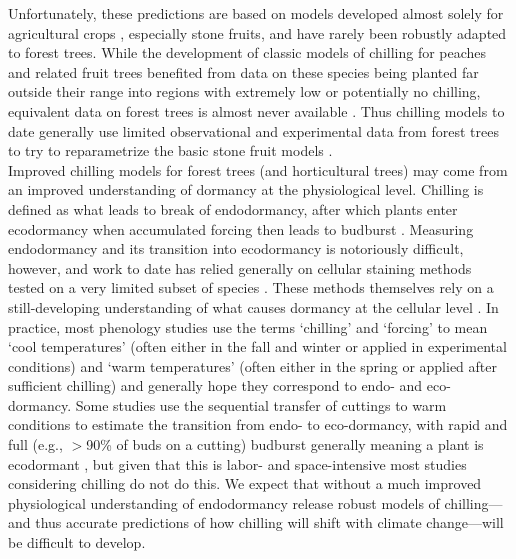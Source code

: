 \documentclass[11pt,letter]{article}
\begin{document}
Unfortunately, these predictions are based on models developed almost solely for agricultural crops \citep[but see][]{harrington2015}, especially stone fruits, and have rarely been robustly adapted to forest trees. While the development of classic models of chilling for peaches and related fruit trees benefited from data on these species being planted far outside their range into regions with extremely low or potentially no chilling, equivalent data on forest trees is almost never available \citep{dennis2003}. Thus chilling models to date generally use limited observational and experimental data from forest trees to try to reparametrize the basic stone fruit models \citep{Chuine2000}.\\

Improved chilling models for forest trees (and horticultural trees) may come from an improved understanding of dormancy at the physiological level. Chilling is defined as what leads to break of endodormancy, after which plants enter ecodormancy when accumulated forcing then leads to budburst \citep{chuine2016}. Measuring endodormancy and its transition into ecodormancy is notoriously difficult, however, and work to date has relied generally on cellular staining methods tested on a very limited subset of species \citep{rinne2011}. These methods themselves rely on a still-developing understanding of what causes dormancy at the cellular level \citep{vanderschoot2014}. In practice, most phenology studies use the terms `chilling' and `forcing' to mean `cool temperatures' (often either in the fall and winter or applied in experimental conditions) and `warm temperatures' (often either in the spring or applied after sufficient chilling) and generally hope they correspond to endo- and eco-dormancy. Some studies use the sequential transfer of cuttings to warm conditions to estimate the transition from endo- to eco-dormancy, with rapid and full (e.g., $>$90\% of buds on a cutting) budburst generally meaning a plant is ecodormant \citep[e.g.,][]{Junttila:2012aa}, but given that this is labor- and space-intensive most studies considering chilling do not do this. We expect that without a much improved physiological understanding of endodormancy release robust models of chilling---and thus accurate predictions of how chilling will shift with climate change---will be difficult to develop. \\ %
\end{document}
